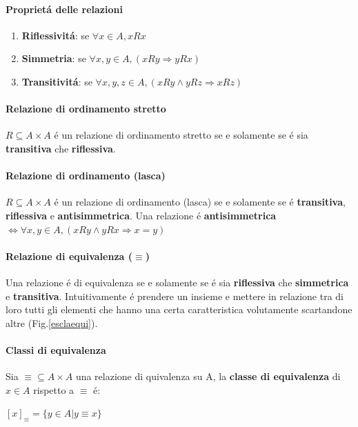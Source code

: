 \documentclass{article}
\begin{document}
\paragraph{Proprietá delle relazioni}
\begin{enumerate}
    \item \textbf{Riflessivitá}: se $\forall x\in A, x\textit{R}x$
    \item \textbf{Simmetria}: se $\forall x,y\in A,(x\textit{R}y \Rightarrow y\textit{R}x)$
    \item \textbf{Transitivitá}: se $\forall x,y,z\in A, (x\textit{R}y \land y\textit{R}z \Rightarrow x\textit{R}z)$
\end{enumerate}

\paragraph{Relazione di ordinamento stretto}
$\textit{R} \subseteq A\times A$ é un relazione di ordinamento stretto se e solamente se é sia \textbf{transitiva} che \textbf{riflessiva}.

\paragraph{Relazione di ordinamento (lasca)}
$\textit{R} \subseteq A\times A$ é un relazione di ordinamento (lasca) se e solamente se é \textbf{transitiva}, \textbf{riflessiva} e \textbf{antisimmetrica}.
Una relazione é \textbf{antisimmetrica} $\Leftrightarrow \forall x,y\in A, (x\textit{R}y \land y\textit{R}x \Rightarrow x=y)$

\paragraph{Relazione di equivalenza ($\equiv$)}
Una relazione é di equivalenza se e solamente se é sia \textbf{riflessiva} che \textbf{simmetrica} e \textbf{transitiva}. Intuitivamente é prendere un insieme e mettere in relazione tra di loro tutti gli elementi che hanno una certa caratteristica volutamente scartandone altre (Fig.\ref{esclaequi}).

\paragraph{Classi di equivalenza}
Sia $\equiv \subseteq A\times A$ una relazione di quivalenza su A, la \textbf{classe di equivalenza} di $x\in A$ rispetto a $\equiv$ é:
\begin{center}
    $[x]_\equiv = \{y \in A | y \equiv x\}$
\end{center}
\end{document}
